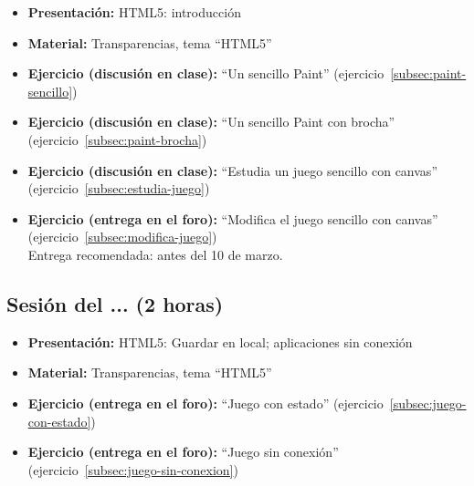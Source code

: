 \documentclass[a4paper,12pt]{report}
\begin{document}
\begin{itemize}
\item \textbf{Presentación:} HTML5: introducción
\item \textbf{Material:} Transparencias, tema ``HTML5''


\item \textbf{Ejercicio (discusión en clase):} ``Un sencillo Paint'' (ejercicio~\ref{subsec:paint-sencillo})
\item \textbf{Ejercicio (discusión en clase):} ``Un sencillo Paint con brocha'' (ejercicio~\ref{subsec:paint-brocha}) \\
 \item \textbf{Ejercicio (discusión en clase):} ``Estudia un juego sencillo con canvas'' (ejercicio~\ref{subsec:estudia-juego})
 \item \textbf{Ejercicio (entrega en el foro):} ``Modifica el juego sencillo con canvas'' (ejercicio~\ref{subsec:modifica-juego}) \\
Entrega recomendada: antes del 10 de marzo.
\end{itemize}


\subsection{Sesión del ... (2 horas)}

\begin{itemize}
 \item \textbf{Presentación:} HTML5: Guardar en local; aplicaciones sin conexión
 \item \textbf{Material:} Transparencias, tema ``HTML5''
 \item \textbf{Ejercicio (entrega en el foro):} ``Juego con estado'' (ejercicio~\ref{subsec:juego-con-estado})
 \item \textbf{Ejercicio (entrega en el foro):} ``Juego sin conexión'' (ejercicio~\ref{subsec:juego-sin-conexion})
 \end{itemize}
\end{document}
